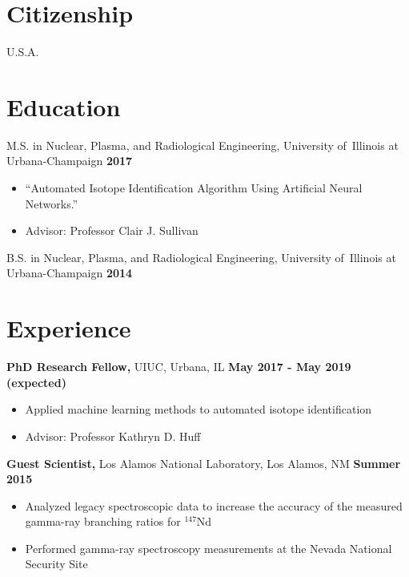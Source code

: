 \documentclass[margin]{res}
\begin{document}
 
\begin{resume} 
 

\section{Citizenship}

U.S.A.

\section{Education} 

\vspace{-.05in}

M.S. in Nuclear, Plasma, and Radiological Engineering, University of\ Illinois at Urbana-Champaign  \hfill \textbf{2017}

\begin{itemize}
\item ``Automated Isotope Identification Algorithm Using Artificial Neural Networks.''
\item Advisor: Professor Clair J. Sullivan
\end{itemize}

\vspace{-.05in}

B.S. in Nuclear, Plasma, and Radiological Engineering, University of\ Illinois at Urbana-Champaign \hfill  \textbf{2014}
 

\section{Experience}

 
 {\bf PhD Research Fellow,} UIUC, Urbana, IL \hfill \textbf{May 2017 - May 2019 (expected) }
 \begin{itemize} \itemsep -3pt  %
 \item Applied machine learning methods to automated isotope identification
 \item Advisor: Professor Kathryn D. Huff
 \end{itemize} 
 
 
 {\bf Guest Scientist,} Los Alamos National Laboratory, Los Alamos, NM \hfill \textbf{Summer 2015}
 \begin{itemize} \itemsep -3pt  %
 \item Analyzed legacy spectroscopic data to increase the accuracy of the measured gamma-ray branching ratios for $^{147}$Nd 
 \item Performed gamma-ray spectroscopy measurements at the Nevada National Security Site
 \end{itemize} 
 

\end{resume}
\end{document}
